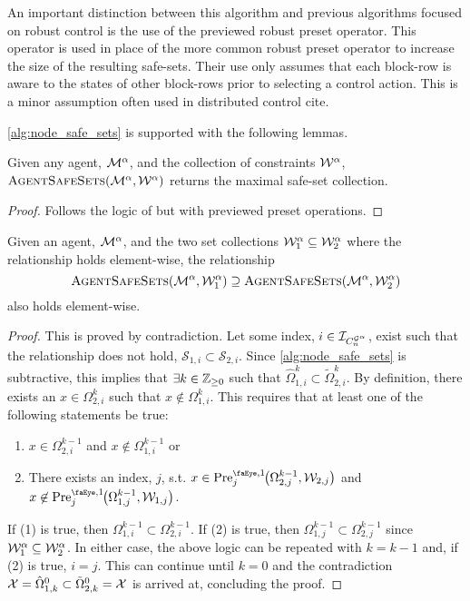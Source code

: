 \begin{remark}
An important distinction between this algorithm and previous algorithms focused on robust control is the use of the previewed robust preset operator. This operator is used in place of the more common robust preset operator to increase the size of the resulting safe-sets. Their use only assumes that each block-row is aware to the states of other block-rows prior to selecting a control action. This is a minor assumption often used in distributed control \alert{cite}.
\end{remark}
\autoref{alg:node_safe_sets} is supported with the following lemmas. 
\begin{lemma}\label{lemma:maximal_proof}
Given any agent, $\mathcal{M}^{\alpha}$, and the collection of constraints  $\mathcal{W}^{\alpha}$, $\Call{AgentSafeSets}{\agent{\agentidx},\wconset{\agentidx}}$ returns the maximal safe-set collection.
\end{lemma}
\begin{proof}
Follows the logic of \cite[Theorem 2]{Danielson2019} but with previewed preset operations.
\end{proof}
\begin{lemma}
Given an agent, $\mathcal{M}^{\alpha}$, and the two set collections $\mathcal{W}^{\alpha}_1\subseteq\mathcal{W}^{\alpha}_2$ where the relationship holds element-wise, the relationship{\small
$$\Call{AgentSafeSets}{\agent{\agentidx},\wconset{\agentidx}_1}\supseteq\Call{AgentSafeSets}{\agent{\agentidx},\wconset{\agentidx}_2}$$}
also holds element-wise. 
\end{lemma}
\begin{proof}
This is proved by contradiction. Let some index, $i\in\idxset{\gnumnodes[\agentidx]}$, exist such that the relationship does not hold, $\mathcal{S}_{1,i}\subset\mathcal{S}_{2,i}$. Since \autoref{alg:node_safe_sets} is subtractive, this implies that $\exists k\in\mathbb{Z}_{\geq 0}$ such that $\hat{\Omega}^k_{1,i}\subset\tilde{\Omega}^k_{2,i}$. By definition, there exists an $x\in\Omega^k_{2,i}$ such that $x\not\in\Omega^k_{1,i}$. This requires that at least one of the following statements be true:
\begin{enumerate}
\item $x\in\Omega^{k-1}_{2,i}$ and $x\not\in\Omega^{k-1}_{1,i}$ or
\item There exists an index, $j$, s.t. $x\in\PreviewedPre[j][1]{\Omega^{k-1}_{2,j},\mathcal{W}_{2,j}}$ and $x\not\in\PreviewedPre[j][1]{\Omega^{k-1}_{1,j},\mathcal{W}_{1,j}}$.
\end{enumerate}
If (1) is true, then $\Omega^{k-1}_{1,i}\subset\Omega^{k-1}_{2,i}$. If (2) is true, then $\Omega^{k-1}_{1,j}\subset\Omega^{k-1}_{2,j}$ since $\mathcal{W}^{\alpha}_1\subseteq\mathcal{W}^{\alpha}_2$. In either case, the above logic can be repeated with $k=k-1$ and, if (2) is true, $i=j$. This can continue until $k=0$ and the contradiction $\xcon = \hat\Omega^0_{1,k}\subset\tilde{\Omega}^0_{2,k}=\xcon$ is arrived at, concluding the proof. 
\end{proof}

